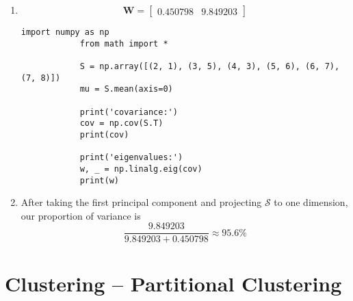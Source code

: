 \begin{enumerate}[label=(\alph*)]
	\item
	      \[ \bm{W} = \begin{bmatrix}
			      0.450798 & 9.849203
		      \end{bmatrix}
	      \]

	      \begin{lstlisting}[style=custom_python,gobble=12]
			import numpy as np
			from math import *

			S = np.array([(2, 1), (3, 5), (4, 3), (5, 6), (6, 7), (7, 8)])
			mu = S.mean(axis=0)

			print('covariance:')
			cov = np.cov(S.T)
			print(cov)

			print('eigenvalues:')
			w, _ = np.linalg.eig(cov)
			print(w)
		  \end{lstlisting}

	\item After taking the first principal component and projecting
	      $\mathcal{S}$ to one dimension, our proportion of variance is
	      \[
		      \frac{9.849203}{9.849203 + 0.450798}
		      \approx 95.6\%
	      \]

\end{enumerate}

\newpage
\section{Clustering -- Partitional Clustering}

